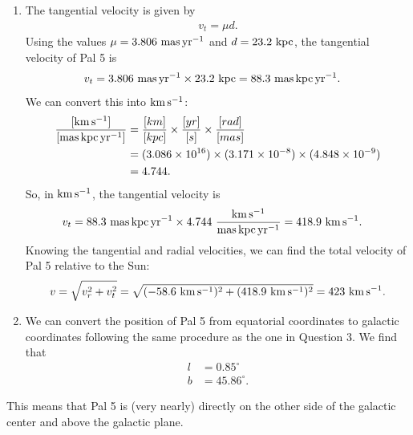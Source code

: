 \documentclass[11pt,letterpaper]{article}
\begin{document}
\begin{enumerate}[label=(\alph*)]
            \item The tangential velocity is given by 
        \begin{align*}
            v_t = \mu d.
        \end{align*}
        Using the values $\mu = 3.806~{\rm mas\,yr^{-1}}$ and $d=23.2~{\rm kpc}$, the tangential velocity of Pal 5 is 
        \begin{align*}
            v_t &= 3.806~{\rm mas\,yr^{-1}}\times 23.2~{\rm kpc} = 88.3~{\rm mas\,kpc\,yr^{-1}}.
        \end{align*}
        We can convert this into $\rm km\,s^{-1}$:
        \begin{align*}
            \rm \frac{[km\,s^{-1}]}{[mas\,kpc\,yr^{-1}]} &= \frac{[km]}{[kpc]}\times\frac{[yr]}{[s]}\times\frac{[rad]}{[mas]} \\
            &= (3.086\times 10^{16})\times (3.171\times 10^{-8})\times (4.848\times 10^{-9}) \\
            &= 4.744.
        \end{align*}
        So, in $\rm km\,s^{-1}$, the tangential velocity is
        \begin{align*}
            v_t &= 88.3~{\rm mas\,kpc\,yr^{-1}} \times 4.744~{\rm \frac{km\,s^{-1}}{mas\,kpc\,yr^{-1}}} = 418.9~{\rm km\,s^{-1}}.
        \end{align*}
        Knowing the tangential and radial velocities, we can find the total velocity of Pal 5 relative to the Sun: 
        \begin{align*}
            v = \sqrt{v_r^2 + v_t^2} = \sqrt{(-58.6~{\rm km\,s^{-1}})^2 + (418.9~{\rm km\,s^{-1}})^2} = 423~{\rm km\,s^{-1}}.
        \end{align*}
    \item We can convert the position of Pal 5 from equatorial coordinates to galactic coordinates following the same procedure as the one in Question 3. We find that 
        \begin{align*}
            l &= 0.85^\circ \\
            b &= 45.86^\circ.
        \end{align*}
    \end{enumerate}
    This means that Pal 5 is (very nearly) directly on the other side of the galactic center and above the galactic plane.
\end{document}
